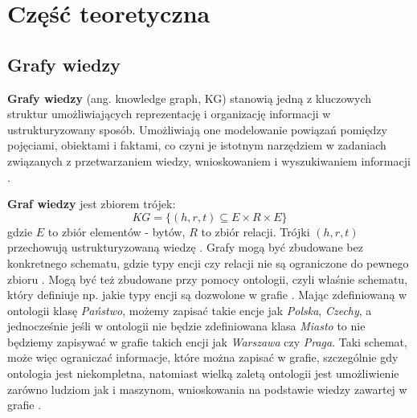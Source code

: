 \documentclass[
a4paper,
12pt,
]{article}
\begin{document}


\newpage

\section{Część teoretyczna}

\subsection{Grafy wiedzy}

\textbf{Grafy wiedzy} (ang. knowledge graph, KG) stanowią jedną z kluczowych struktur umożliwiających reprezentację i organizację informacji w ustrukturyzowany sposób. Umożliwiają one modelowanie powiązań pomiędzy pojęciami, obiektami i faktami, co czyni je istotnym narzędziem w zadaniach związanych z przetwarzaniem wiedzy, wnioskowaniem i wyszukiwaniem informacji \cite{kg:def}.

\textbf{Graf wiedzy} jest zbiorem trójek: 
$$KG = \{(h, r, t) \subseteq E \times R \times E\}$$ 
gdzie $E$ to zbiór elementów - bytów, $R$ to zbiór relacji. Trójki $(h, r, t)$ przechowują ustrukturyzowaną wiedzę \cite{graph:llm:roadmap}. Grafy mogą być zbudowane bez konkretnego schematu, gdzie typy encji czy relacji nie są ograniczone do pewnego zbioru \cite{kg:ontofree}. Mogą być też zbudowane przy pomocy ontologii, czyli właśnie schematu, który definiuje np. jakie typy encji są dozwolone w grafie \cite{kg:yago}. Mając zdefiniowaną w ontologii klasę \textit{Państwo}, możemy zapisać takie encje jak \textit{Polska}, \textit{Czechy}, a jednocześnie jeśli w ontologii nie będzie zdefiniowana klasa \textit{Miasto} to nie będziemy zapisywać w grafie takich encji jak \textit{Warszawa} czy \textit{Praga}. Taki schemat, może więc ograniczać informacje, które można zapisać w grafie, szczególnie gdy ontologia jest niekompletna, natomiast wielką zaletą ontologii jest umożliwienie zarówno ludziom jak i maszynom, wnioskowania na podstawie wiedzy zawartej w grafie \cite{kg:yago}.
\end{document}
